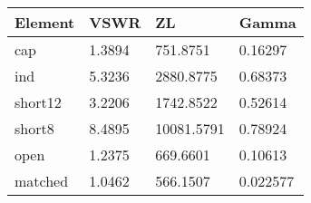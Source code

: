 \begin{tabular}{llll}
Element & VSWR & ZL & Gamma \\ 
\hline 
cap & 1.3894 & 751.8751 & 0.16297 \\ 
ind & 5.3236 & 2880.8775 & 0.68373 \\ 
short12 & 3.2206 & 1742.8522 & 0.52614 \\ 
short8 & 8.4895 & 10081.5791 & 0.78924 \\ 
open & 1.2375 & 669.6601 & 0.10613 \\ 
matched & 1.0462 & 566.1507 & 0.022577 \\ 
\hline 
\end{tabular}